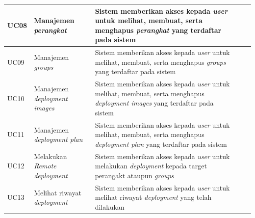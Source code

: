 \begin{table}[ht]
\begin{tabular}{|p{2cm}|p{2cm}|p{3cm}|p{3cm}|p{2cm}|}
    \hline
    UC08          & Manajemen \textit{perangkat}               & Sistem memberikan akses kepada \textit{user} untuk melihat, membuat, serta menghapus \textit{perangkat} yang terdaftar pada sistem                                \\
    \hline
    UC09          & Manajemen \textit{groups}                  & Sistem memberikan akses kepada \textit{user} untuk melihat, membuat, serta menghapus \textit{groups} yang terdaftar pada sistem                                   \\
    \hline
    UC10          & Manajemen \textit{deployment images}       & Sistem memberikan akses kepada \textit{user} untuk melihat, membuat, serta menghapus \textit{deployment images} yang terdaftar pada sistem                        \\
    \hline
    UC11          & Manajemen \textit{deployment plan}         & Sistem memberikan akses kepada \textit{user} untuk melihat, membuat, serta menghapus \textit{deployment plan} yang terdaftar pada sistem                          \\
    \hline
    UC12          & Melakukan \textit{Remote deployment}       & Sistem memberikan akses kepada \textit{user} untuk melakukan \textit{deployment} kepada target perangakt ataupun \textit{groups}                                  \\
    \hline
    UC13          & Melihat riwayat \textit{deployment}        & Sistem memberikan akses kepada \textit{user} untuk melihat riwayat \textit{deployment} yang telah dilakukan                                                       \\
    \hline
  \end{tabular}
\end{table}
\egroup


